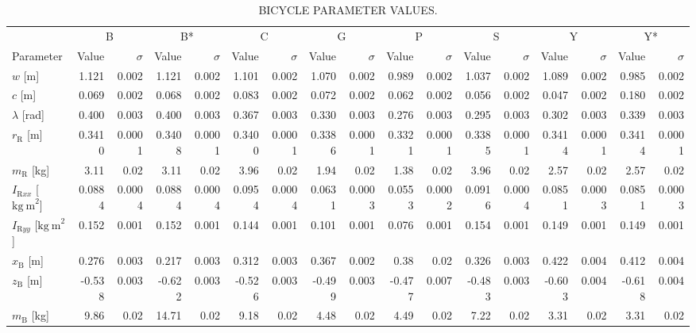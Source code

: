 \documentclass[../report/parameterReport.tex]{subfiles}
\begin{document}
\begin{landscape}
\begin{table}[tb]
\begin{center}
\caption{BICYCLE PARAMETER VALUES.}
{\small
\begin{tabular}{l|rr|rr|rr|rr|rr|rr|rr|rr}
 & \multicolumn{2}{c}{B} & \multicolumn{2}{c}{B*} & \multicolumn{2}{c}{C} & \multicolumn{2}{c}{G} & \multicolumn{2}{c}{P} & \multicolumn{2}{c}{S} & \multicolumn{2}{c}{Y} & \multicolumn{2}{c}{Y*}\\
Parameter & Value & $\sigma$ & Value & $\sigma$
          & Value & $\sigma$ & Value & $\sigma$
          & Value & $\sigma$ & Value & $\sigma$
          & Value & $\sigma$ & Value & $\sigma$\\
\hline
$w$ [m] & 1.121 & 0.002 & 1.121 & 0.002 & 1.101 & 0.002 & 1.070 & 0.002 & 0.989 & 0.002 & 1.037 & 0.002 & 1.089 & 0.002 & 0.985 & 0.002\\
$c$ [m] & 0.069 & 0.002 & 0.068 & 0.002 & 0.083 & 0.002 & 0.072 & 0.002 & 0.062 & 0.002 & 0.056 & 0.002 & 0.047 & 0.002 & 0.180 & 0.002\\
\emph{$\lambda$} [rad] & 0.400 & 0.003 & 0.400 & 0.003 & 0.367 & 0.003 & 0.330 & 0.003 & 0.276 & 0.003 & 0.295 & 0.003 & 0.302 & 0.003 & 0.339 & 0.003\\
\emph{$r_\mathrm{R}$} [m] & 0.3410 & 0.0001 & 0.3408 & 0.0001 & 0.3400 & 0.0001 & 0.3386 & 0.0001 & 0.3321 & 0.0001 & 0.3385 & 0.0001 & 0.3414 & 0.0001 & 0.3414 & 0.0001\\
\emph{$m_\mathrm{R}$} [kg] & 3.11 & 0.02 & 3.11 & 0.02 & 3.96 & 0.02 & 1.94 & 0.02 & 1.38 & 0.02 & 3.96 & 0.02 & 2.57 & 0.02 & 2.57 & 0.02\\
\emph{$I_{\mathrm{R}xx}$} [$\mathrm{kg\ m}^2$] & 0.0884 & 0.0004 & 0.0884 & 0.0004 & 0.0954 & 0.0004 & 0.0631 & 0.0003 & 0.0553 & 0.0002 & 0.0916 & 0.0004 & 0.0851 & 0.0003 & 0.0851 & 0.0003\\
\emph{$I_{\mathrm{R}yy}$} [$\mathrm{kg\ m}^2$] & 0.152 & 0.001 & 0.152 & 0.001 & 0.144 & 0.001 & 0.101 & 0.001 & 0.076 & 0.001 & 0.154 & 0.001 & 0.149 & 0.001 & 0.149 & 0.001\\
\emph{$x_\mathrm{B}$} [m] & 0.276 & 0.003 & 0.217 & 0.003 & 0.312 & 0.003 & 0.367 & 0.002 & 0.38 & 0.02 & 0.326 & 0.003 & 0.422 & 0.004 & 0.412 & 0.004\\
\emph{$z_\mathrm{B}$} [m] & -0.538 & 0.003 & -0.622 & 0.003 & -0.526 & 0.003 & -0.499 & 0.003 & -0.477 & 0.007 & -0.483 & 0.003 & -0.603 & 0.004 & -0.618 & 0.004\\
\emph{$m_\mathrm{B}$} [kg] & 9.86 & 0.02 & 14.71 & 0.02 & 9.18 & 0.02 & 4.48 & 0.02 & 4.49 & 0.02 & 7.22 & 0.02 & 3.31 & 0.02 & 3.31 & 0.02\\

\end{tabular}}
\end{center}
\end{table}
\end{landscape}
\end{document}
